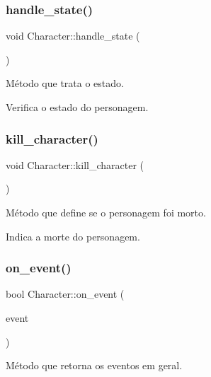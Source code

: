 \subsubsection{\texorpdfstring{handle\+\_\+state()}{handle\_state()}}
{\footnotesize\ttfamily void Character\+::handle\+\_\+state (\begin{DoxyParamCaption}{ }\end{DoxyParamCaption})\hspace{0.3cm}{\ttfamily [protected]}}



Método que trata o estado. 

Verifica o estado do personagem. \mbox{\label{classCharacter_adb0d4f9c0ebbc0f9b19cb0a1f4b20df7}} 
\subsubsection{\texorpdfstring{kill\+\_\+character()}{kill\_character()}}
{\footnotesize\ttfamily void Character\+::kill\+\_\+character (\begin{DoxyParamCaption}{ }\end{DoxyParamCaption})\hspace{0.3cm}{\ttfamily [protected]}}



Método que define se o personagem foi morto. 

Indica a morte do personagem. \mbox{\label{classCharacter_a92d3a1ad2ceba203bf72584c4c4029d7}} 
\subsubsection{\texorpdfstring{on\+\_\+event()}{on\_event()}}
{\footnotesize\ttfamily bool Character\+::on\+\_\+event (\begin{DoxyParamCaption}\item[{const Game\+Event \&}]{event }\end{DoxyParamCaption})\hspace{0.3cm}{\ttfamily [protected]}}



Método que retorna os eventos em geral. 

